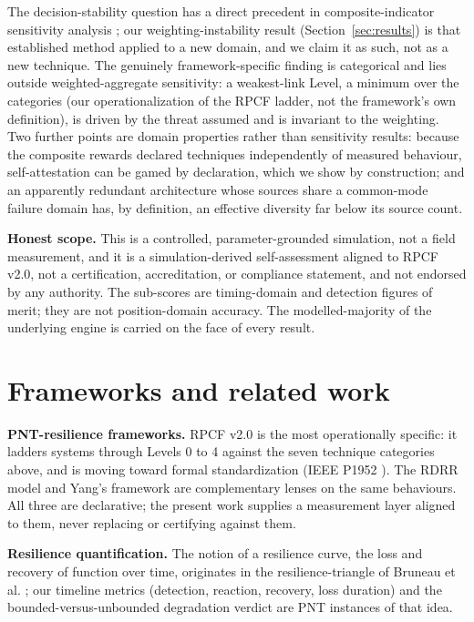 \documentclass[conference]{IEEEtran}
\begin{document}
The decision-stability question has a direct precedent in composite-indicator sensitivity analysis \cite{saisana,oecd,saltelli}; our weighting-instability result (Section~\ref{sec:results}) is that established method applied to a new domain, and we claim it as such, not as a new technique. The genuinely framework-specific finding is categorical and lies outside weighted-aggregate sensitivity: a weakest-link Level, a minimum over the categories (our operationalization of the RPCF ladder, not the framework's own definition), is driven by the threat assumed and is invariant to the weighting. Two further points are domain properties rather than sensitivity results: because the composite rewards declared techniques independently of measured behaviour, self-attestation can be gamed by declaration, which we show by construction; and an apparently redundant architecture whose sources share a common-mode failure domain has, by definition, an effective diversity far below its source count.

\textbf{Honest scope.} This is a controlled, parameter-grounded simulation, not a field measurement, and it is a simulation-derived self-assessment aligned to RPCF v2.0, not a certification, accreditation, or compliance statement, and not endorsed by any authority. The sub-scores are timing-domain and detection figures of merit; they are not position-domain accuracy. The modelled-majority of the underlying engine is carried on the face of every result.

\section{Frameworks and related work}
\textbf{PNT-resilience frameworks.} RPCF v2.0 \cite{rpcf} is the most operationally specific: it ladders systems through Levels 0 to 4 against the seven technique categories above, and is moving toward formal standardization (IEEE P1952 \cite{p1952}). The RDRR model \cite{rethinkpnt} and Yang's framework \cite{yang} are complementary lenses on the same behaviours. All three are declarative; the present work supplies a measurement layer aligned to them, never replacing or certifying against them.

\textbf{Resilience quantification.} The notion of a resilience curve, the loss and recovery of function over time, originates in the resilience-triangle of Bruneau et al. \cite{bruneau}; our timeline metrics (detection, reaction, recovery, loss duration) and the bounded-versus-unbounded degradation verdict are PNT instances of that idea.
\end{document}
